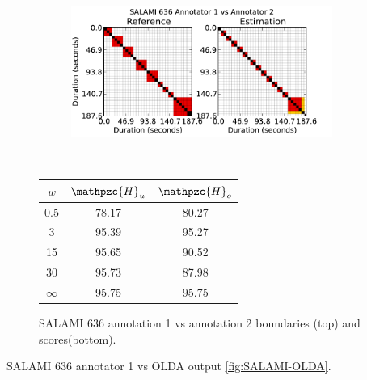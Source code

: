 \documentclass{article}
\begin{document}
\begin{figure}
  \centering
  \begin{subfigure}{0.5\textwidth}
    \centering
    \includegraphics[width=0.94\textwidth]{plots/SALAMI-SALAMI.pdf}
  \end{subfigure}%
  \\
  \begin{minipage}{0.5\textwidth}
    \centering
    \vspace{10pt}
    \begin{tabular}{|c|c|c|}
      \hline
      $w$       & $\mathpzc{H}_u$       & $\mathpzc{H}_o$      \\
      \hline
      0.5       & 78.17       & 80.27      \\     
      3         & 95.39       & 95.27      \\
      15        & 95.65       & 90.52    \\
      30        & 95.73       & 87.98    \\
      $\infty$  & 95.75       & 95.75    \\
      \hline
    \end{tabular}
  \end{minipage}
  \caption{SALAMI 636 annotation 1 vs annotation 2 boundaries (top) and scores(bottom).}
  \label{fig:SALAMI-SALAMI}
\end{figure}

SALAMI 636 annotator 1 vs OLDA\cite{McFee2014}  output \ref{fig:SALAMI-OLDA}.
\end{document}
